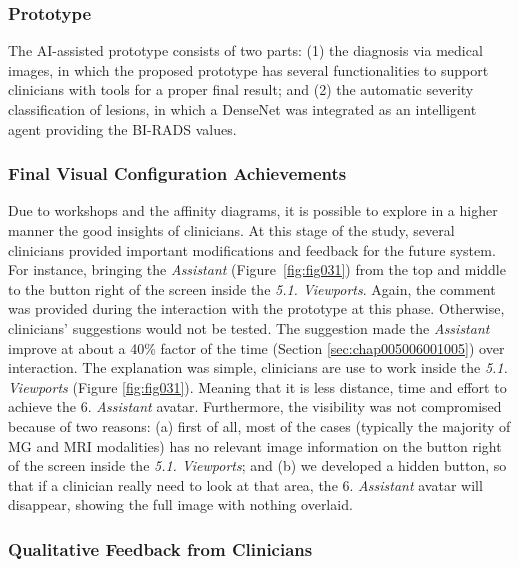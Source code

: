 \subsubsection{Prototype}
\label{sec:chap005006002005}

The \ac{AI}-assisted prototype consists of two parts:
(1) the diagnosis via medical images, in which the proposed prototype has several functionalities to support clinicians with tools for a proper final result; and
(2) the automatic severity classification of lesions, in which a DenseNet was integrated as an intelligent agent providing the \ac{BI-RADS} values.

\subsubsection{Final Visual Configuration Achievements}
\label{sec:chap005006002006}

Due to workshops and the affinity diagrams, it is possible to explore in a higher manner the good insights of clinicians.
At this stage of the study, several clinicians provided important modifications and feedback for the future system.
For instance, bringing the {\it Assistant} (Figure~\ref{fig:fig031}) from the top and middle to the button right of the screen inside the {\it 5.1. Viewports}.
Again, the comment was provided during the interaction with the prototype at this phase.
Otherwise, clinicians' suggestions would not be tested.
The suggestion made the {\it Assistant} improve at about a 40\% factor of the time (Section \ref{sec:chap005006001005}) over interaction.
The explanation was simple, clinicians are use to work inside the {\it 5.1. Viewports} (Figure \ref{fig:fig031}).
Meaning that it is less distance, time and effort to achieve the {6. \it Assistant} avatar.
Furthermore, the visibility was not compromised because of two reasons: (a) first of all, most of the cases (typically the majority of MG and MRI modalities) has no relevant image information on the button right of the screen inside the {\it 5.1. Viewports}; and (b) we developed a hidden button, so that if a clinician really need to look at that area, the {6. \it Assistant} avatar will disappear, showing the full image with nothing overlaid.

\subsubsection{Qualitative Feedback from Clinicians}
\label{sec:chap005006002007}


